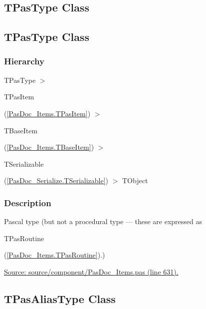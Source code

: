 \documentclass{report}
\newif\ifpdf
\begin{document}
\subsection*{\large{\textbf{TPasType Class}}\normalsize\hspace{1ex}\hrulefill}
\else
\subsection*{TPasType Class}
\fi
\label{PasDoc_Items.TPasType}
\subsubsection*{\large{\textbf{Hierarchy}}\normalsize\hspace{1ex}\hfill}
TPasType {$>$} \begin{ttfamily}TPasItem\end{ttfamily}(\ref{PasDoc_Items.TPasItem}) {$>$} \begin{ttfamily}TBaseItem\end{ttfamily}(\ref{PasDoc_Items.TBaseItem}) {$>$} \begin{ttfamily}TSerializable\end{ttfamily}(\ref{PasDoc_Serialize.TSerializable}) {$>$} 
TObject
\subsubsection*{\large{\textbf{Description}}\normalsize\hspace{1ex}\hfill}
Pascal type (but not a procedural type --- these are expressed as \begin{ttfamily}TPasRoutine\end{ttfamily}(\ref{PasDoc_Items.TPasRoutine}).)\par
\href{https://github.com/pasdoc/pasdoc/blob/master/source/component/PasDoc_Items.pas#L631}{Source: source/component/PasDoc{\_}Items.pas (line 631).}\ifpdf
\subsection*{\large{\textbf{TPasAliasType Class}}\normalsize\hspace{1ex}\hrulefill}
\else
\subsection*{TPasAliasType Class}
\fi
\label{PasDoc_Items.TPasAliasType}
\end{document}
